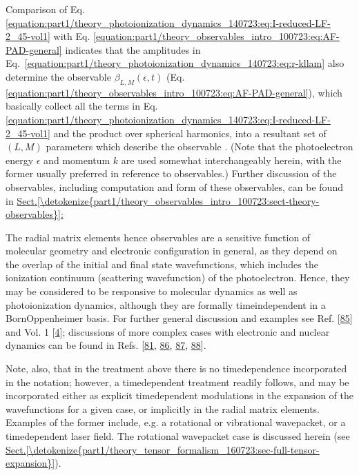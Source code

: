 \documentclass[letterpaper,table,10pt,english]{jupyterBook}
\begin{document}
\sphinxAtStartPar
Comparison of Eq. \eqref{equation:part1/theory_photoionization_dynamics_140723:eq:I-reduced-LF-2_45-vol1} with Eq. \eqref{equation:part1/theory_observables_intro_100723:eq:AF-PAD-general} indicates that the amplitudes
in Eq. \eqref{equation:part1/theory_photoionization_dynamics_140723:eq:r-kllam} also determine the observable {\hyperref[\detokenize{backmatter/glossary:term-anisotropy-paramters}]{}} \(\beta_{L,M}(\epsilon,t)\) (Eq.
\eqref{equation:part1/theory_observables_intro_100723:eq:AF-PAD-general}), which basically collect all the terms in Eq. \eqref{equation:part1/theory_photoionization_dynamics_140723:eq:I-reduced-LF-2_45-vol1} and the product over spherical harmonics, into a resultant set of \((L,M)\) parameters which describe the observable {\hyperref[\detokenize{backmatter/glossary:term-PADs}]{}}. (Note that the photoelectron energy
\(\epsilon\) and momentum \(k\) are used somewhat interchangeably herein,
with the former usually preferred in reference to observables.) Further discussion of the observables, including computation and form of these observables, can be found in \hyperref[\detokenize{part1/theory_observables_intro_100723:sect-theory-observables}]{Sect.\@ \ref{\detokenize{part1/theory_observables_intro_100723:sect-theory-observables}}:}

\sphinxAtStartPar
The radial matrix elements \sphinxhyphen{} hence observables \sphinxhyphen{} are
a sensitive function of molecular geometry and electronic configuration
in general, as they depend on the overlap of the initial and final state wavefunctions, which includes the ionization continuum (scattering wavefunction) of the photoelectron.
Hence, they may be considered to be responsive to molecular
dynamics as well as photoionization dynamics, although they are formally time\sphinxhyphen{}independent in a
Born\sphinxhyphen{}Oppenheimer basis. For further general discussion and examples see
Ref. {[}\hyperlink{cite.backmatter/bibliography:id970}{85}{]} and  Vol. 1 {[}\hyperlink{cite.backmatter/bibliography:id675}{4}{]}; discussions of more
complex cases with electronic and nuclear dynamics can be found in Refs.
{[}\hyperlink{cite.backmatter/bibliography:id880}{81}, \hyperlink{cite.backmatter/bibliography:id510}{86}, \hyperlink{cite.backmatter/bibliography:id907}{87}, \hyperlink{cite.backmatter/bibliography:id904}{88}{]}.

\sphinxAtStartPar
Note, also, that in the treatment above there is no time\sphinxhyphen{}dependence
incorporated in the notation; however, a time\sphinxhyphen{}dependent treatment
readily follows, and may be incorporated either as explicit
time\sphinxhyphen{}dependent modulations in the expansion of the wavefunctions for a
given case, or implicitly in the radial matrix elements. Examples of the
former include, e.g. a rotational or vibrational wavepacket, or a
time\sphinxhyphen{}dependent laser field. The rotational wavepacket case is discussed
herein (see \hyperref[\detokenize{part1/theory_tensor_formalism_160723:sec-full-tensor-expansion}]{Sect.\@ \ref{\detokenize{part1/theory_tensor_formalism_160723:sec-full-tensor-expansion}}}).
\end{document}

